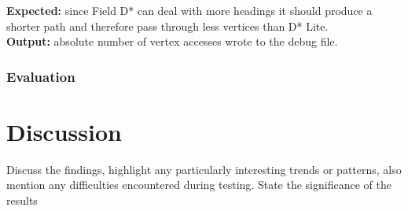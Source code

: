 \noindent
\textbf{Expected:} since Field D* can deal with more headings it should produce a shorter path and therefore pass through less vertices than D* Lite.\\

\noindent
\textbf{Output:} absolute number of vertex accesses wrote to the debug file.

\subsubsection{Evaluation}

\newpage

\section{Discussion}
Discuss the findings, highlight any particularly interesting trends or patterns, also mention any difficulties encountered during testing. State the significance of the results